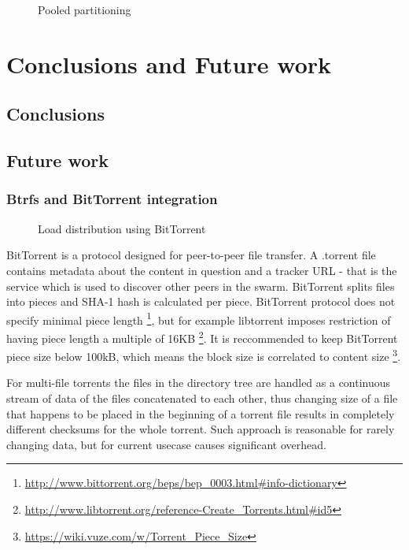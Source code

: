\documentclass{article}
\begin{document}
\begin{figure}[!htb]
\centering
\scalebox{0.5}{}
\caption{Pooled partitioning}
\label{fig:digraph}
\end{figure}




\chapter{Conclusions and Future work}

\section{Conclusions}



\section{Future work}

\subsection{Btrfs and BitTorrent integration}


\begin{figure}[!htb]
\centering
\scalebox{0.5}{}
\caption{Load distribution using BitTorrent}
\label{fig:digraph}
\end{figure}

BitTorrent is a protocol designed for peer-to-peer file transfer.
A .torrent file contains metadata about the content in question and a
tracker URL - that is the service which is used to discover other peers in the swarm.
BitTorrent splits files into pieces and SHA-1 hash is calculated per piece.
BitTorrent protocol does not specify minimal piece length
\footnote{\url{http://www.bittorrent.org/beps/bep_0003.html#info-dictionary}},
but for example libtorrent imposes restriction of having piece length
a multiple of 16KB
\footnote{\url{http://www.libtorrent.org/reference-Create_Torrents.html#id5}}.
It is reccommended to keep BitTorrent piece size below 100kB,
which means the block size is correlated to content size
\footnote{\url{https://wiki.vuze.com/w/Torrent_Piece_Size}}.

For multi-file torrents the files in the directory tree are handled
as a continuous stream of data of the files concatenated to each other,
thus changing size of a file that happens to be placed in the beginning of a torrent
file results in completely different checksums for the whole torrent.
Such approach is reasonable for rarely changing data, but for current usecase
causes significant overhead.
\end{document}
